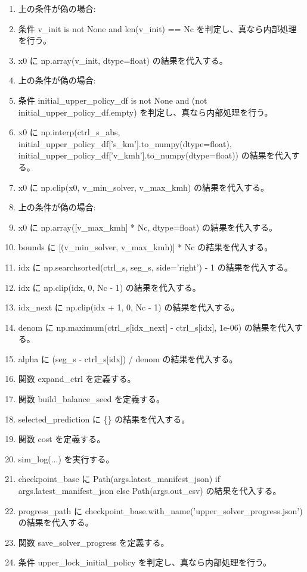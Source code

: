 \documentclass[a4paper,11pt]{article}
\begin{document}
\begin{enumerate}[leftmargin=1.8em]
\item   上の条件が偽の場合:
\item   条件 v\_init is not None and len(v\_init) == Nc を判定し、真なら内部処理を行う。
\item     x0 に np.array(v\_init, dtype=float) の結果を代入する。
\item     上の条件が偽の場合:
\item     条件 initial\_upper\_policy\_df is not None and (not initial\_upper\_policy\_df.empty) を判定し、真なら内部処理を行う。
\item       x0 に np.interp(ctrl\_s\_abs, initial\_upper\_policy\_df['s\_km'].to\_numpy(dtype=float), initial\_upper\_policy\_df['v\_kmh'].to\_numpy(dtype=float)) の結果を代入する。
\item       x0 に np.clip(x0, v\_min\_solver, v\_max\_kmh) の結果を代入する。
\item       上の条件が偽の場合:
\item       x0 に np.array([v\_max\_kmh] * Nc, dtype=float) の結果を代入する。
\item bounds に [(v\_min\_solver, v\_max\_kmh)] * Nc の結果を代入する。
\item idx に np.searchsorted(ctrl\_s, seg\_s, side='right') - 1 の結果を代入する。
\item idx に np.clip(idx, 0, Nc - 1) の結果を代入する。
\item idx\_next に np.clip(idx + 1, 0, Nc - 1) の結果を代入する。
\item denom に np.maximum(ctrl\_s[idx\_next] - ctrl\_s[idx], 1e-06) の結果を代入する。
\item alpha に (seg\_s - ctrl\_s[idx]) / denom の結果を代入する。
\item 関数 expand\_ctrl を定義する。
\item 関数 build\_balance\_seed を定義する。
\item selected\_prediction に \{\} の結果を代入する。
\item 関数 cost を定義する。
\item sim\_log(...) を実行する。
\item checkpoint\_base に Path(args.latest\_manifest\_json) if args.latest\_manifest\_json else Path(args.out\_csv) の結果を代入する。
\item progress\_path に checkpoint\_base.with\_name('upper\_solver\_progress.json') の結果を代入する。
\item 関数 save\_solver\_progress を定義する。
\item 条件 upper\_lock\_initial\_policy を判定し、真なら内部処理を行う。

\end{enumerate}
\end{document}
